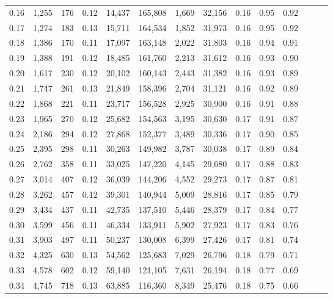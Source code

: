 \begin{tabular}{rrrrrrrrrrrrrr}
0.16 &  1,255 &  176 &  0.12 &   14,437 &  165,808 &   1,669 &  32,156 &  0.16 &  0.95 &      0.92 \\
0.17 &  1,274 &  183 &  0.13 &   15,711 &  164,534 &   1,852 &  31,973 &  0.16 &  0.95 &      0.92 \\
0.18 &  1,386 &  170 &  0.11 &   17,097 &  163,148 &   2,022 &  31,803 &  0.16 &  0.94 &      0.91 \\
0.19 &  1,388 &  191 &  0.12 &   18,485 &  161,760 &   2,213 &  31,612 &  0.16 &  0.93 &      0.90 \\
0.20 &  1,617 &  230 &  0.12 &   20,102 &  160,143 &   2,443 &  31,382 &  0.16 &  0.93 &      0.89 \\
0.21 &  1,747 &  261 &  0.13 &   21,849 &  158,396 &   2,704 &  31,121 &  0.16 &  0.92 &      0.89 \\
0.22 &  1,868 &  221 &  0.11 &   23,717 &  156,528 &   2,925 &  30,900 &  0.16 &  0.91 &      0.88 \\
0.23 &  1,965 &  270 &  0.12 &   25,682 &  154,563 &   3,195 &  30,630 &  0.17 &  0.91 &      0.87 \\
0.24 &  2,186 &  294 &  0.12 &   27,868 &  152,377 &   3,489 &  30,336 &  0.17 &  0.90 &      0.85 \\
0.25 &  2,395 &  298 &  0.11 &   30,263 &  149,982 &   3,787 &  30,038 &  0.17 &  0.89 &      0.84 \\
0.26 &  2,762 &  358 &  0.11 &   33,025 &  147,220 &   4,145 &  29,680 &  0.17 &  0.88 &      0.83 \\
0.27 &  3,014 &  407 &  0.12 &   36,039 &  144,206 &   4,552 &  29,273 &  0.17 &  0.87 &      0.81 \\
0.28 &  3,262 &  457 &  0.12 &   39,301 &  140,944 &   5,009 &  28,816 &  0.17 &  0.85 &      0.79 \\
0.29 &  3,434 &  437 &  0.11 &   42,735 &  137,510 &   5,446 &  28,379 &  0.17 &  0.84 &      0.77 \\
0.30 &  3,599 &  456 &  0.11 &   46,334 &  133,911 &   5,902 &  27,923 &  0.17 &  0.83 &      0.76 \\
0.31 &  3,903 &  497 &  0.11 &   50,237 &  130,008 &   6,399 &  27,426 &  0.17 &  0.81 &      0.74 \\
0.32 &  4,325 &  630 &  0.13 &   54,562 &  125,683 &   7,029 &  26,796 &  0.18 &  0.79 &      0.71 \\
0.33 &  4,578 &  602 &  0.12 &   59,140 &  121,105 &   7,631 &  26,194 &  0.18 &  0.77 &      0.69 \\
0.34 &  4,745 &  718 &  0.13 &   63,885 &  116,360 &   8,349 &  25,476 &  0.18 &  0.75 &      0.66 \\

\end{tabular}
